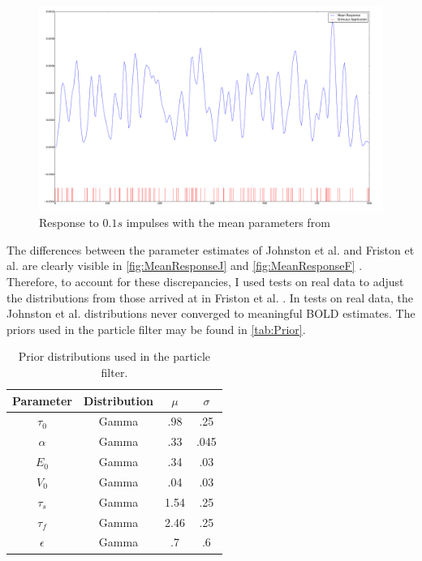 \begin{figure}
\centering
\includegraphics[trim=6cm 2cm 6cm 2cm,width=15cm]{images/mean_response_johnston}
\caption{Response to $0.1s$ impulses with the mean parameters from \cite{Johnston2008}}
\label{fig:MeanResponseJ}
\end{figure}

The differences between the parameter estimates of Johnston et al. and 
Friston et al. are clearly visible in \autoref{fig:MeanResponseJ} and 
\autoref{fig:MeanResponseF} \cite{Johnston2008,Friston2002}. 
Therefore, to account for these discrepancies, I used tests on
real data to adjust the distributions from those arrived at in 
Friston et al. \cite{Friston2002}. In tests on real data, the Johnston et al.
distributions never converged to meaningful BOLD estimates.
The priors used in the particle filter may be found in \autoref{tab:Prior}.

\begin{table}[t]
\centering
\begin{tabular}{|c || c | c | c |}
\hline 
Parameter & Distribution & $\mu$ & $\sigma$ \\
\hline
$\tau_0$ & Gamma & .98 & .25 \\
$\alpha$ & Gamma & .33 & .045\\
$E_0$    & Gamma & .34 & .03  \\
$V_0$    & Gamma & .04 & .03 \\
$\tau_s$ & Gamma & 1.54  & .25\\
$\tau_f$ & Gamma & 2.46  & .25\\
$\epsilon$ & Gamma & .7  & .6 \\
\hline
\end{tabular}
\caption{Prior distributions used in the particle filter.}
\label{tab:Prior} 
\end{table}

